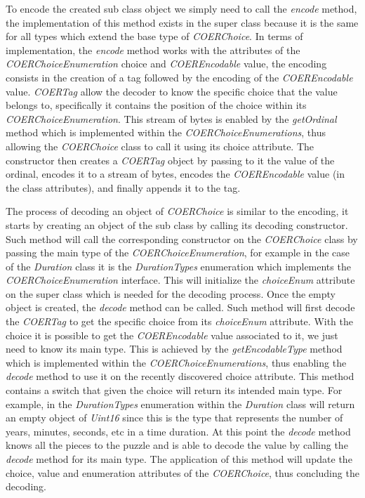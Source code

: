 To encode the created sub class object we simply need to call the \textit{encode} method, the implementation of this method exists in the super class because it is the same for all types which extend the base type of \textit{COERChoice}. In terms of implementation, the \textit{encode} method works with the attributes of the \textit{COERChoiceEnumeration} choice and \textit{COEREncodable} value, the encoding consists in the creation of a tag followed by the encoding of the \textit{COEREncodable} value. \textit{COERTag} allow the decoder to know the specific choice that the value belongs to, specifically it contains the position of the choice within its \textit{COERChoiceEnumeration}. This stream of bytes is enabled by the \textit{getOrdinal} method which is implemented within the \textit{COERChoiceEnumerations}, thus allowing the \textit{COERChoice} class to call it using its choice attribute. The constructor then creates a \textit{COERTag} object by passing to it the value of the ordinal, encodes it to a stream of bytes, encodes the \textit{COEREncodable} value (in the class attributes), and finally appends it to the tag. 

The process of decoding an object of \textit{COERChoice} is similar to the encoding, it starts by creating an object of the sub class by calling its decoding constructor. Such method will call the corresponding constructor on the \textit{COERChoice} class by passing the main type of the \textit{COERChoiceEnumeration}, for example in the case of the \textit{Duration} class it is the \textit{DurationTypes} enumeration which implements the \textit{COERChoiceEnumeration} interface. This will initialize the \textit{choiceEnum} attribute on the super class which is needed for the decoding process. Once the empty object is created, the \textit{decode} method can be called. Such method will first decode the \textit{COERTag} to get the specific choice from its \textit{choiceEnum} attribute. With the choice it is possible to get the \textit{COEREncodable} value associated to it, we just need to know its main type. This is achieved by the \textit{getEncodableType} method which is implemented within the \textit{COERChoiceEnumerations}, thus enabling the \textit{decode} method to use it on the recently discovered choice attribute. This method contains a switch that given the choice will return its intended main type. For example, in the \textit{DurationTypes} enumeration within the \textit{Duration} class will return an empty object of \textit{Uint16} since this is the type that represents the number of years, minutes, seconds, etc in a time duration. At this point the \textit{decode} method knows all the pieces to the puzzle and is able to decode the value by calling the \textit{decode} method for its main type. The application of this method will update the choice, value and enumeration attributes of the \textit{COERChoice}, thus concluding the decoding. 


